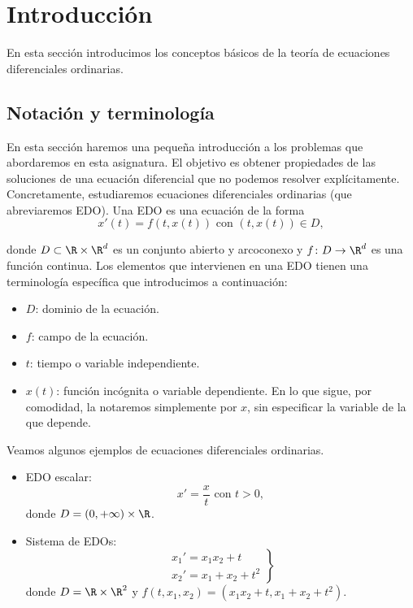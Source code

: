 \documentclass{article}
\begin{document}
\maketitle

\section{Introducción}

En esta sección introducimos los conceptos básicos de la teoría de ecuaciones diferenciales ordinarias.

\subsection{Notación y terminología}

En esta sección haremos una pequeña introducción a los problemas que abordaremos en esta
asignatura. El objetivo es obtener propiedades de las soluciones de una ecuación diferencial que no
podemos resolver explícitamente. Concretamente, estudiaremos ecuaciones diferenciales ordinarias
(que abreviaremos EDO). Una EDO es una ecuación de la forma
\begin{equation}
  \label{eq:edo}
  x'(t) = f(t,x(t)) \text{ con } (t,x(t)) \in D,
  \tag{E}
\end{equation}

donde $D \subset \R \times \R^d$ es un conjunto abierto y arcoconexo y $f\colon D \to \R^d$ es una
función continua. Los elementos que intervienen en una EDO tienen una terminología específica que
introducimos a continuación:

\begin{itemize}
\item $D$: dominio de la ecuación.
\item $f$: campo de la ecuación.
\item $t$: tiempo o variable independiente.
\item $x(t)$: función incógnita o variable dependiente. En lo que sigue, por comodidad, la notaremos
  simplemente por $x$, sin especificar la variable de la que depende.
\end{itemize}

\begin{ex} \label{ex:ex} Veamos algunos ejemplos de ecuaciones diferenciales ordinarias.
  
  \begin{itemize}
  \item EDO escalar:
    \[x' = \frac{x}{t} \text{ con } t > 0,\] donde $D = (0, +\infty) \times \R$.
  \item Sistema de EDOs:
    \[
      \left.
        \begin{array}{r}
          x_1' = x_1x_2 + t \\
          x_2' = x_1 + x_2 + t^2
        \end{array}
      \right\}
    \]
    donde $D = \R \times \R^2$ y $f(t, x_1, x_2) = (x_1x_2 + t, x_1 + x_2 + t^2)$. \qedhere
  \end{itemize}
\end{ex}
\end{document}
